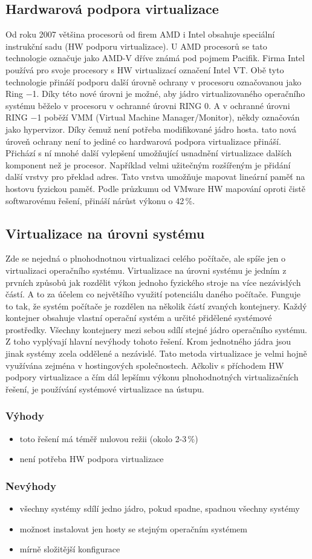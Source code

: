 \subsection{Hardwarová podpora virtualizace}
Od roku 2007 většina procesorů od firem AMD i Intel obsahuje speciální instrukční sadu (HW podporu virtualizace). U AMD procesorů se tato technologie označuje jako AMD-V dříve známá pod pojmem Pacifik. Firma Intel používá pro svoje procesory s HW virtualizací označení Intel VT. Obě tyto technologie přináší podporu další úrovně ochrany v procesoru označovanou jako Ring $-$1. Díky této nové úrovni je možné, aby jádro virtualizovaného operačního systému běželo v procesoru v ochranné úrovni RING 0. A v ochranné úrovni RING $-$1 poběží VMM (Virtual Machine Manager/Monitor), někdy označován jako hypervizor. Díky čemuž není potřeba modifikované jádro hosta. tato nová úroveň ochrany není to jediné co hardwarová podpora virtualizace přináší. Přichází s ní mnohé další vylepšení umožňující usnadnění virtualizace dalších komponent než je procesor. Například velmi užitečným rozšířeným je přidání další vrstvy pro překlad adres. Tato vrstva umožňuje mapovat lineární paměť na hostovu fyzickou paměť. Podle průzkumu od VMware HW mapování oproti čistě softwarovému řešení, přináší nárůst výkonu o 42\,\%.

\subsection{Virtualizace na úrovni systému}
Zde se nejedná o plnohodnotnou virtualizaci celého počítače, ale spíše jen o virtualizaci operačního systému. Virtualizace na úrovni systému je jedním z prvních způsobů jak rozdělit výkon jednoho fyzického stroje na více nezávislých částí. A to za účelem co největšího využití potenciálu daného počítače. Funguje to tak, že systém počítače je rozdělen na několik částí zvaných kontejnery. Každý kontejner obsahuje vlastní operační systém a určité přidělené systémové prostředky. Všechny kontejnery mezi sebou sdílí stejné jádro operačního systému. Z toho vyplývají hlavní nevýhody tohoto řešení. Krom jednotného jádra jsou jinak systémy zcela oddělené a nezávislé. Tato metoda virtualizace je velmi hojně využívána zejména v hostingových společnostech. Ačkoliv s příchodem HW podpory virtualizace a čím dál lepšímu výkonu plnohodnotných virtualizačních řešení, je používání systémové virtualizace na ústupu.

\subsubsection*{Výhody}
\begin{itemize}
  \item toto řešení má téměř nulovou režii (okolo 2-3\,\%)
  \item není potřeba HW podpora virtualizace
\end{itemize}

\subsubsection*{Nevýhody}
\begin{itemize}
  \item všechny systémy sdílí jedno jádro, pokud spadne, spadnou všechny systémy
  \item možnost instalovat jen hosty se stejným operačním systémem
  \item mírně složitější konfigurace
\end{itemize}
